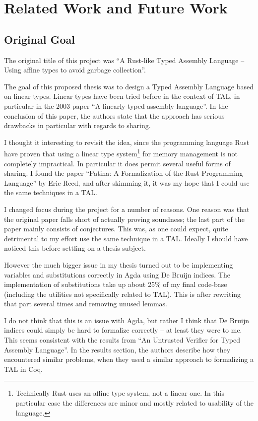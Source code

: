 \chapter{Related Work and Future Work}
\label{chap:future}
\section{Original Goal}

The original title of this project was ``A Rust-like Typed Assembly Language --
Using affine types to avoid garbage collection''.

The goal of this proposed thesis was to design a Typed Assembly Language based
on linear types. Linear types have been tried before in the context of TAL, in
particular in the 2003 paper ``A linearly typed assembly
language''\cite{ltal}. In the conclusion of this paper, the authors state that
the approach has serious drawbacks in particular with regards to sharing.

I thought it interesting to revisit the idea, since the programming language
Rust\cite{rust} have proven that using a linear type system\footnote{Technically
  Rust uses an affine type system, not a linear one. In this particular case the
  differences are minor and mostly related to usability of the language.} for
memory management is not completely impractical. In particular it does permit
several useful forms of sharing. I found the paper ``Patina: A Formalization of
the Rust Programming Language''\cite{patina} by Eric Reed, and after skimming
it, it was my hope that I could use the same techniques in a TAL.

I changed focus during the project for a number of reasons. One reason was that
the original paper falls short of actually proving soundness; the last part of
the paper mainly consists of conjectures. This was, as one could expect, quite
detrimental to my effort use the same technique in a TAL. Ideally I should have
noticed this before settling on a thesis subject.

However the much bigger issue in my thesis turned out to be implementing
variables and substitutions correctly in Agda using De Bruijn indices. The
implementation of substitutions take up about 25\% of my final code-base
(including the utilities not specifically related to TAL). This is after
rewriting that part several times and removing unused lemmas.

I do not think that this is an issue with Agda, but rather I think that De
Bruijn indices could simply be hard to formalize correctly -- at least they were
to me. This seems consistent with the results from ``An Untrusted Verifier for
Typed Assembly Language''\cite{untrusted}. In the results section, the authors
describe how they encountered similar problems, when they used a similar
approach to formalizing a TAL in Coq.

